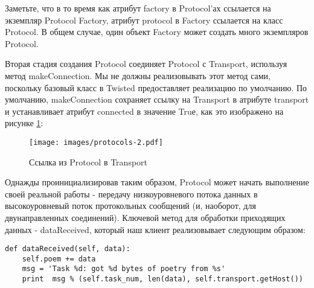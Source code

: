
Заметьте, что в то время как атрибут factory в 
Protocol'ах ссылается на экземпляр Protocol Factory, 
атрибут protocol в Factory ссылается на класс Protocol. 
В общем случае, один объект Factory может создать 
много экземпляров Protocol.


Вторая стадия создания Protocol соединяет Protocol с 
Transport, используя метод makeConnection. Мы не должны 
реализовывать этот метод сами, поскольку базовый класс в 
Twisted предоставляет реализацию по умолчанию. По умолчанию, 
makeConnection сохраняет ссылку на Transport в атрибуте 
transport и устанавливает атрибут connected в значение Truе, 
как это изображено на рисунке \ref{fig:protocols-2}:

\begin{figure}[h]
\begin{center}
    \texttt{[image: images/protocols-2.pdf]}
    \caption{Ссылка из Protocol в Transport\label{fig:protocols-2}}
\end{center}
\end{figure}



Однажды проинициализировав таким образом, Protocol 
может начать выполнение своей реальной работы - 
передачу низкоуровневого потока данных в высокоуровневый 
поток протокольных сообщений (и, наоборот, для двунаправленных соединений). 
Ключевой метод для обработки приходящих данных - dataReceived, 
который наш клиент реализовывает следующим образом:

 \begin{verbatim}
def dataReceived(self, data):
    self.poem += data
    msg = 'Task %d: got %d bytes of poetry from %s'
    print  msg % (self.task_num, len(data), self.transport.getHost())
\end{verbatim} 

